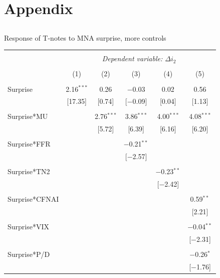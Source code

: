 \documentclass{beamer}
\begin{document}
\section{Appendix}
\subsection{}


\begin{frame}{Response of T-notes to MNA surprise, more controls}
\begin{table}[!htbp] 
    \centering 
    \tiny 
{\renewcommand{\arraystretch}{0.84}
\begin{tabular}{@{\extracolsep{5pt}}lccccc} 
\\[-1.8ex]\hline 
\hline \\[-1.8ex] 
 & \multicolumn{5}{c}{\textit{Dependent variable: $\Delta i_2$}} \\ 
\cline{2-6} 
\\[-1.8ex] & (1) & (2) & (3) & (4) & (5)\\ 
\hline \\[-1.8ex] 
 Surprise & 2.16$^{***}$ & 0.26 & $-$0.03 & 0.02 & 0.56 \\ 
  & [17.35] & [0.74] & [$-$0.09] & [0.04] & [1.13] \\ 
  & & & & & \\ 
 Surprise*MU &  & 2.76$^{***}$ & 3.86$^{***}$ & 4.00$^{***}$ & 4.08$^{***}$ \\
  &  & [5.72] & [6.39] & [6.16] & [6.20] \\ 
  & & & & & \\ 
 Surprise*FFR &  &  & $-$0.21$^{**}$ &  &  \\ 
  &  &  & [$-$2.57] &  &  \\ 
  & & & & & \\ 
 Surprise*TN2 &  &  &  & $-$0.23$^{**}$ &  \\ 
  &  &  &  & [$-$2.42] &  \\ 
  & & & & & \\ 
 Surprise*CFNAI &  &  &  &  & 0.59$^{**}$ \\ 
  &  &  &  &  & [2.21] \\ 
  & & & & & \\ 
 Surprise*VIX &  &  &  &  & $-$0.04$^{**}$ \\ 
  &  &  &  &  & [$-$2.31] \\ 
  & & & & & \\ 
 Surprise*P/D &  &  &  &  & $-$0.26$^{*}$ \\ 
  &  &  &  &  & [$-$1.76] \\ 

\end{tabular}}
\end{table}
\end{frame}
\end{document}
